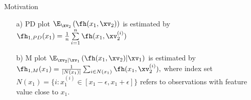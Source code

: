 \documentclass[11pt,compress,t,notes=noshow, aspectratio=169, xcolor=table]{beamer}
\begin{document}
\begin{frame}{Motivation}
\begin{enumerate}
\item[a)] PD plot $\E_{\xv_2} \left( \fh(x_1, \xv_2) \right)$ is estimated by $ \fh_{1, PD}(x_1) = \frac{1}{n} \sum\limits_{i=1}^n \fh(x_1, \xv_2^{(i)})$
\item[b)] M plot $\E_{\xv_2|\xv_1} \left( \fh(x_1, \xv_2) \middle| \xv_1\right)$ is
estimated by $\fh_{1, M}(x_1) = \textstyle\frac{1}{|N(x_1)|} \sum_{i \in N(x_1)} \fh(x_1, \xv_2^{(i)}),$
where index set $N(x_1) = \{i: x_1^{(i)} \in [x_1 - \epsilon, x_1 + \epsilon]\}$ refers to observations with feature value close to $x_1$. %
\end{enumerate}
\end{frame}
\end{document}
